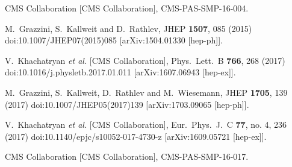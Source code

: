 \documentclass[10pt]{article}
\begin{document}
\begin{thebibliography}{99}



  CMS Collaboration [CMS Collaboration],
  CMS-PAS-SMP-16-004.

  M.~Grazzini, S.~Kallweit and D.~Rathlev,
  JHEP {\bf 1507}, 085 (2015)
  doi:10.1007/JHEP07(2015)085
  [arXiv:1504.01330 [hep-ph]].

  V.~Khachatryan {\it et al.} [CMS Collaboration],
  Phys.\ Lett.\ B {\bf 766}, 268 (2017)
  doi:10.1016/j.physletb.2017.01.011
  [arXiv:1607.06943 [hep-ex]].

  M.~Grazzini, S.~Kallweit, D.~Rathlev and M.~Wiesemann,
  JHEP {\bf 1705}, 139 (2017)
  doi:10.1007/JHEP05(2017)139
  [arXiv:1703.09065 [hep-ph]].

  V.~Khachatryan {\it et al.} [CMS Collaboration],
  Eur.\ Phys.\ J.\ C {\bf 77}, no. 4, 236 (2017)
  doi:10.1140/epjc/s10052-017-4730-z
  [arXiv:1609.05721 [hep-ex]].

  CMS Collaboration [CMS Collaboration],
  CMS-PAS-SMP-16-017.


\end{thebibliography}
\end{document}
